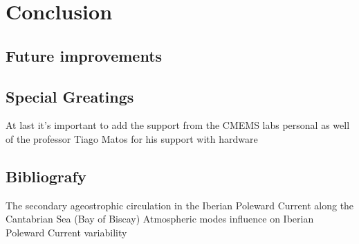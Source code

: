 \chapter{Conclusion}

\section{Future improvements}
\section{Special Greatings}
At last it's important to add the support from the 
CMEMS labs personal as well of the professor Tiago Matos for his support with hardware
\section{Bibliografy}
The secondary ageostrophic circulation in the Iberian Poleward Current along the Cantabrian Sea (Bay of Biscay)
Atmospheric modes influence on Iberian Poleward Current variability
